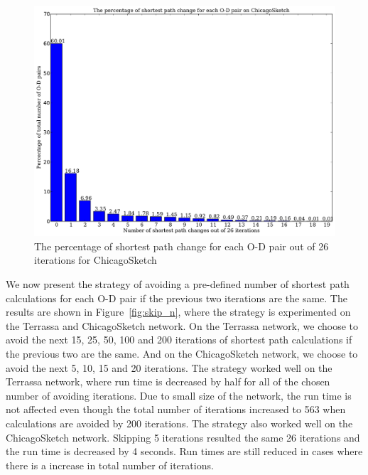 \begin{figure}[H]
    \centering
    \includegraphics[height=.5\textheight]{img/sp_change}
    \caption{The percentage of shortest path change for each O-D pair out of 26 iterations for ChicagoSketch}
    \label{fig:sp_change}
\end{figure}

We now present the strategy of avoiding a pre-defined number of shortest path calculations for each O-D pair if the previous two iterations are the same.
The results are shown in Figure~\ref{fig:skip_n},
where the strategy is experimented on the Terrassa and ChicagoSketch network.
On the Terrassa network,
we choose to avoid the next 15, 25, 50, 100 and 200 iterations of shortest path calculations if the previous two are the same.
And on the ChicagoSketch network,
we choose to avoid the next 5, 10, 15 and 20 iterations.
The strategy worked well on the Terrassa network,
where run time is decreased by half for all of the chosen number of avoiding iterations.
Due to small size of the network,
the run time is not affected even though the total number of iterations increased to 563 when calculations are avoided by 200 iterations.
The strategy also worked well on the ChicagoSketch network.
Skipping 5 iterations resulted the same 26 iterations and the run time is decreased by 4 seconds.
Run times are still reduced in cases where there is a increase in total number of iterations.

